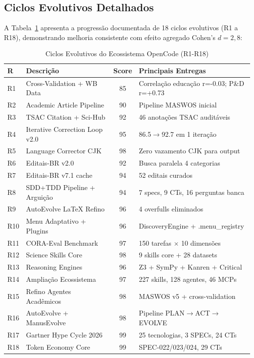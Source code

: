 \subsection{Ciclos Evolutivos Detalhados}

A Tabela~\ref{tab:ciclos-evolutivos} apresenta a progressão documentada de 18 ciclos evolutivos (R1 a R18), demonstrando melhoria consistente com efeito agregado Cohen's $d = 2,8$:

\begin{table}[H]
\centering
\caption{Ciclos Evolutivos do Ecossistema OpenCode (R1-R18)}
\label{tab:ciclos-evolutivos}
\begin{tabular}{p{0.6cm}p{3.5cm}cp{5cm}}
\toprule
\textbf{R} & \textbf{Descrição} & \textbf{Score} & \textbf{Principais Entregas} \\
\midrule
R1 & Cross-Validation + WB Data & 85 & Correlação educação r=-0.03; P\&D r=+0.73 \\
R2 & Academic Article Pipeline & 90 & Pipeline MASWOS inicial \\
R3 & TSAC Citation + Sci-Hub & 92 & 46 anotações TSAC auditáveis \\
R4 & Iterative Correction Loop v2.0 & 95 & 86.5$\rightarrow$92.7 em 1 iteração \\
R5 & Language Corrector CJK & 98 & Zero vazamento CJK para output \\
R6 & Editais-BR v2.0 & 92 & Busca paralela 4 categorias \\
R7 & Editais-BR v7.1 cache & 94 & 52 editais curados \\
R8 & SDD+TDD Pipeline + Arguição & 94 & 7 specs, 9 CTs, 16 perguntas banca \\
R9 & AutoEvolve LaTeX Refino & 96 & 4 overfulls eliminados \\
R10 & Menu Adaptativo + Plugins & 96 & DiscoveryEngine + .menu\_registry \\
R11 & CORA-Eval Benchmark & 97 & 150 tarefas $\times$ 10 dimensões \\
R12 & Science Skills Core & 98 & 9 skills core + 28 datasets \\
R13 & Reasoning Engines & 96 & Z3 + SymPy + Kanren + Critical \\
R14 & Ampliação Ecossistema & 97 & 227 skills, 128 agentes, 46 MCPs \\
R15 & Refino Agentes Acadêmicos & 98 & MASWOS v5 + cross-validation \\
R16 & AutoEvolve + ManusEvolve & 98 & Pipeline PLAN$\rightarrow$ACT$\rightarrow$EVOLVE \\
R17 & Gartner Hype Cycle 2026 & 99 & 25 tecnologias, 3 SPECs, 24 CTs \\
R18 & Token Economy Core & 99 & SPEC-022/023/024, 29 CTs \\
\bottomrule
\end{tabular}
\end{table}

